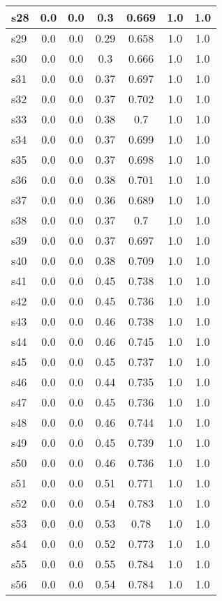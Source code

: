 \documentclass{article}
\begin{document}
\begin{tabular}{|l|c|c|c|c|c|c|}
\hline
s28 &0.0 & 0.0 & 0.3 & 0.669 & 1.0 & 1.0\\
\hline
s29 &0.0 & 0.0 & 0.29 & 0.658 & 1.0 & 1.0\\
\hline
s30 &0.0 & 0.0 & 0.3 & 0.666 & 1.0 & 1.0\\
\hline
s31 &0.0 & 0.0 & 0.37 & 0.697 & 1.0 & 1.0\\
\hline
s32 &0.0 & 0.0 & 0.37 & 0.702 & 1.0 & 1.0\\
\hline
s33 &0.0 & 0.0 & 0.38 & 0.7 & 1.0 & 1.0\\
\hline
s34 &0.0 & 0.0 & 0.37 & 0.699 & 1.0 & 1.0\\
\hline
s35 &0.0 & 0.0 & 0.37 & 0.698 & 1.0 & 1.0\\
\hline
s36 &0.0 & 0.0 & 0.38 & 0.701 & 1.0 & 1.0\\
\hline
s37 &0.0 & 0.0 & 0.36 & 0.689 & 1.0 & 1.0\\
\hline
s38 &0.0 & 0.0 & 0.37 & 0.7 & 1.0 & 1.0\\
\hline
s39 &0.0 & 0.0 & 0.37 & 0.697 & 1.0 & 1.0\\
\hline
s40 &0.0 & 0.0 & 0.38 & 0.709 & 1.0 & 1.0\\
\hline
s41 &0.0 & 0.0 & 0.45 & 0.738 & 1.0 & 1.0\\
\hline
s42 &0.0 & 0.0 & 0.45 & 0.736 & 1.0 & 1.0\\
\hline
s43 &0.0 & 0.0 & 0.46 & 0.738 & 1.0 & 1.0\\
\hline
s44 &0.0 & 0.0 & 0.46 & 0.745 & 1.0 & 1.0\\
\hline
s45 &0.0 & 0.0 & 0.45 & 0.737 & 1.0 & 1.0\\
\hline
s46 &0.0 & 0.0 & 0.44 & 0.735 & 1.0 & 1.0\\
\hline
s47 &0.0 & 0.0 & 0.45 & 0.736 & 1.0 & 1.0\\
\hline
s48 &0.0 & 0.0 & 0.46 & 0.744 & 1.0 & 1.0\\
\hline
s49 &0.0 & 0.0 & 0.45 & 0.739 & 1.0 & 1.0\\
\hline
s50 &0.0 & 0.0 & 0.46 & 0.736 & 1.0 & 1.0\\
\hline
s51 &0.0 & 0.0 & 0.51 & 0.771 & 1.0 & 1.0\\
\hline
s52 &0.0 & 0.0 & 0.54 & 0.783 & 1.0 & 1.0\\
\hline
s53 &0.0 & 0.0 & 0.53 & 0.78 & 1.0 & 1.0\\
\hline
s54 &0.0 & 0.0 & 0.52 & 0.773 & 1.0 & 1.0\\
\hline
s55 &0.0 & 0.0 & 0.55 & 0.784 & 1.0 & 1.0\\
\hline
s56 &0.0 & 0.0 & 0.54 & 0.784 & 1.0 & 1.0\\

\end{tabular}
\end{document}
